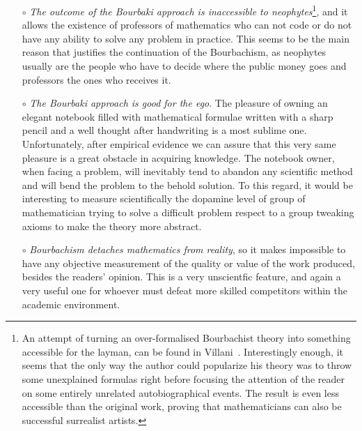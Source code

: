 \documentclass[]{scrartcl}
\theoremstyle{definition}
\begin{document}
\begin{itemize}
    \item[$\circ$] \emph{The outcome of the Bourbaki approach is inaccessible to neophytes}\footnote{
        An attempt of turning an over-formalised Bourbachist theory into something accessible for the layman, can be found in Villani~\cite{villani2003livingtheorem}. Interestingly enough, it seems that the only way the author could popularize his theory was to throw some unexplained formulas right before focusing the attention of the reader on some entirely unrelated autobiographical events. The result is even less accessible than the original work, proving that mathematicians can also be successful surrealist artists.
    }, and it allows the existence of professors of mathematics who can not code or do not have any ability to solve any problem in practice. This seems to be the main reason that justifies the continuation of the Bourbachism, as neophytes usually are the people who have to decide where the public money goes and professors the ones who receives it.

    \item[$\circ$] \emph{The Bourbaki approach is good for the ego}. The pleasure of owning an elegant notebook filled with mathematical formulae written with a sharp pencil and a well thought after handwriting is a most sublime one. Unfortunately, after empirical evidence we can assure that this very same pleasure is a great obstacle in acquiring knowledge. The notebook owner, when facing a problem, will inevitably tend to abandon any scientific method and will bend the problem to the behold solution. To this regard, it would be interesting to measure scientifically the dopamine level of group of mathematician trying to solve a difficult problem respect to a group tweaking axioms to make the theory more abstract.

    \item[$\circ$] \emph{Bourbachism detaches mathematics from reality}, so it makes impossible to have any objective measurement of the quality or value of the work produced, besides the readers' opinion. This is a very unscientfic feature, and again a very useful one for whoever must defeat more skilled competitors within the academic environment.


\end{itemize}
\end{document}
